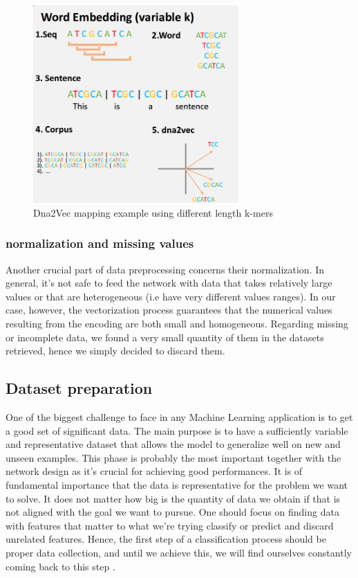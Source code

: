 \begin{figure}[hbt!]
	\centering
	\includegraphics[width=0.7\textwidth, height=0.3\textheight]{Figures/dna2vec}
	\caption{Dna2Vec mapping example using different length k-mers}
	\label{fig:dna2vec}
\end{figure}

\subsubsection{normalization and missing values}
Another crucial part of data preprocessing concerns their normalization. In general, it's not safe to feed the network with data that takes relatively large values or that are heterogeneous (i.e have very different values ranges). In our case, however, the vectorization process guarantees that the numerical values resulting from the encoding are both small and homogeneous. Regarding missing or incomplete data, we found a very small quantity  of them in the datasets retrieved, hence we simply decided to discard them.  

\subsection{Dataset preparation}
One of the biggest challenge to face in any Machine Learning application is to get a good set of significant data.
The main purpose is to have a sufficiently variable and representative dataset that allows the model to generalize well on new and unseen examples. This phase is probably the most important together with the network design as it's crucial for achieving good performances. It is of fundamental importance that the data is representative for the problem we want to solve. It does not matter how big is the  quantity of data we obtain if that is not aligned with the goal we want to pursue. One should focus on finding data with features that matter to what we’re trying classify or predict and discard unrelated features. Hence, the first step of a classification process should be proper data collection, and until we achieve this, we will find ourselves constantly coming back to this step \cite{imbalanced_datasets}.


